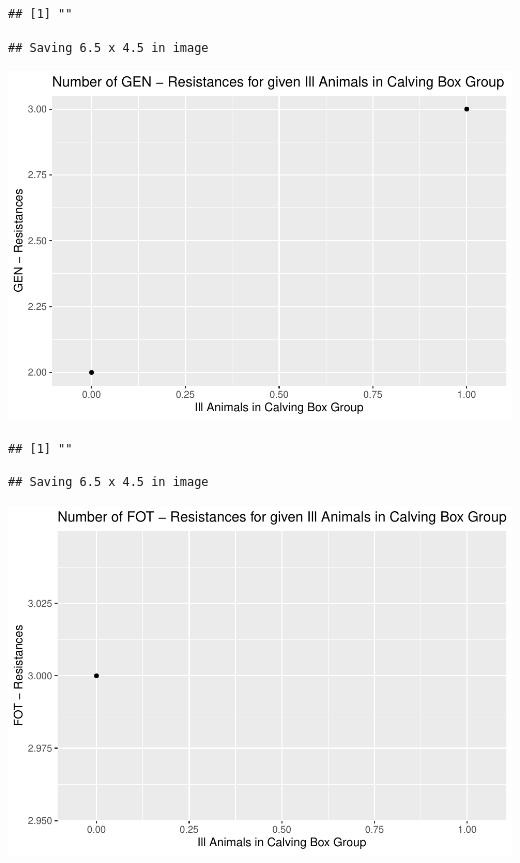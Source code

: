 \documentclass[
]{article}
\begin{document}
\begin{verbatim}
## [1] ""
\end{verbatim}

\begin{verbatim}
## Saving 6.5 x 4.5 in image
\end{verbatim}

\includegraphics{NResistenzen_files/figure-latex/binary_or_nominal_variables-24.pdf}

\begin{verbatim}
## [1] ""
\end{verbatim}

\begin{verbatim}
## Saving 6.5 x 4.5 in image
\end{verbatim}

\includegraphics{NResistenzen_files/figure-latex/binary_or_nominal_variables-25.pdf}
\end{document}
